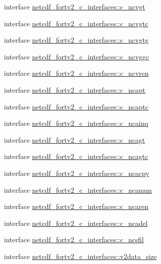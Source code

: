 \begin{DoxyCompactItemize}
\item 
interface \hyperlink{interfacenetcdf__fortv2__c__interfaces_1_1c__ncvgt}{netcdf\+\_\+fortv2\+\_\+c\+\_\+interfaces\+::c\+\_\+ncvgt}
\item 
interface \hyperlink{interfacenetcdf__fortv2__c__interfaces_1_1c__ncvgtc}{netcdf\+\_\+fortv2\+\_\+c\+\_\+interfaces\+::c\+\_\+ncvgtc}
\item 
interface \hyperlink{interfacenetcdf__fortv2__c__interfaces_1_1c__ncvgtg}{netcdf\+\_\+fortv2\+\_\+c\+\_\+interfaces\+::c\+\_\+ncvgtg}
\item 
interface \hyperlink{interfacenetcdf__fortv2__c__interfaces_1_1c__ncvggc}{netcdf\+\_\+fortv2\+\_\+c\+\_\+interfaces\+::c\+\_\+ncvggc}
\item 
interface \hyperlink{interfacenetcdf__fortv2__c__interfaces_1_1c__ncvren}{netcdf\+\_\+fortv2\+\_\+c\+\_\+interfaces\+::c\+\_\+ncvren}
\item 
interface \hyperlink{interfacenetcdf__fortv2__c__interfaces_1_1c__ncapt}{netcdf\+\_\+fortv2\+\_\+c\+\_\+interfaces\+::c\+\_\+ncapt}
\item 
interface \hyperlink{interfacenetcdf__fortv2__c__interfaces_1_1c__ncaptc}{netcdf\+\_\+fortv2\+\_\+c\+\_\+interfaces\+::c\+\_\+ncaptc}
\item 
interface \hyperlink{interfacenetcdf__fortv2__c__interfaces_1_1c__ncainq}{netcdf\+\_\+fortv2\+\_\+c\+\_\+interfaces\+::c\+\_\+ncainq}
\item 
interface \hyperlink{interfacenetcdf__fortv2__c__interfaces_1_1c__ncagt}{netcdf\+\_\+fortv2\+\_\+c\+\_\+interfaces\+::c\+\_\+ncagt}
\item 
interface \hyperlink{interfacenetcdf__fortv2__c__interfaces_1_1c__ncagtc}{netcdf\+\_\+fortv2\+\_\+c\+\_\+interfaces\+::c\+\_\+ncagtc}
\item 
interface \hyperlink{interfacenetcdf__fortv2__c__interfaces_1_1c__ncacpy}{netcdf\+\_\+fortv2\+\_\+c\+\_\+interfaces\+::c\+\_\+ncacpy}
\item 
interface \hyperlink{interfacenetcdf__fortv2__c__interfaces_1_1c__ncanam}{netcdf\+\_\+fortv2\+\_\+c\+\_\+interfaces\+::c\+\_\+ncanam}
\item 
interface \hyperlink{interfacenetcdf__fortv2__c__interfaces_1_1c__ncaren}{netcdf\+\_\+fortv2\+\_\+c\+\_\+interfaces\+::c\+\_\+ncaren}
\item 
interface \hyperlink{interfacenetcdf__fortv2__c__interfaces_1_1c__ncadel}{netcdf\+\_\+fortv2\+\_\+c\+\_\+interfaces\+::c\+\_\+ncadel}
\item 
interface \hyperlink{interfacenetcdf__fortv2__c__interfaces_1_1c__ncsfil}{netcdf\+\_\+fortv2\+\_\+c\+\_\+interfaces\+::c\+\_\+ncsfil}
\item 
interface \hyperlink{interfacenetcdf__fortv2__c__interfaces_1_1v2data__size}{netcdf\+\_\+fortv2\+\_\+c\+\_\+interfaces\+::v2data\+\_\+size}
\end{DoxyCompactItemize}
